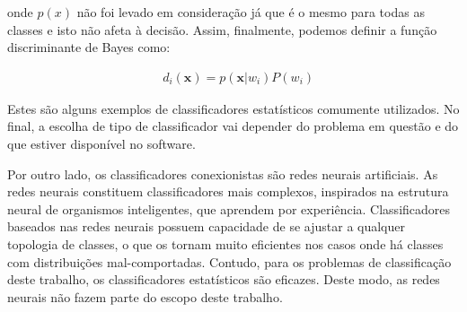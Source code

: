 onde $p(x)$ não foi levado em consideração já que é o mesmo para todas
as classes e isto não afeta à decisão. Assim, finalmente, podemos
definir a função discriminante de Bayes como:

\begin{align}\label{eq-dibayes}
 &d_i(\textbf{x})= p(\textbf{x}|w_{i})P(w_i)
\end{align}

Estes são alguns exemplos de classificadores estatísticos comumente
utilizados. No final, a escolha de tipo de classificador vai depender
do problema em questão e do que estiver disponível no software.

Por outro lado, os classificadores conexionistas são redes neurais
artificiais. As redes neurais constituem classificadores mais
complexos, inspirados na estrutura neural de organismos inteligentes,
que aprendem por experiência.\cite{52} Classificadores baseados nas
redes neurais possuem capacidade de se ajustar a qualquer topologia de
classes, o que os tornam muito eficientes nos casos onde há classes
com distribuições mal-comportadas.\cite{88} Contudo, para os problemas
de classificação deste trabalho, os classificadores estatísticos são
eficazes. Deste modo, as redes neurais não fazem parte do escopo deste
trabalho.
